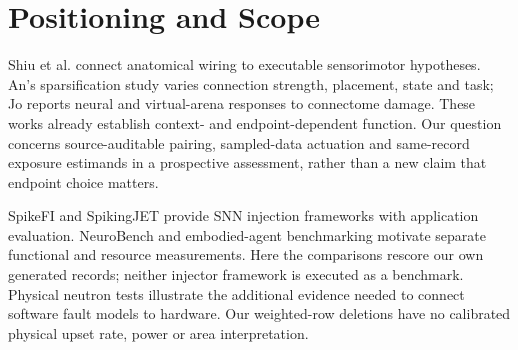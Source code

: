 \section{Positioning and Scope}
Shiu et al.\cite{shiu2024drosophila} connect anatomical wiring to executable sensorimotor hypotheses. An's sparsification study\cite{an2026sparse} varies connection strength, placement, state and task; Jo\cite{jo2026simulating} reports neural and virtual-arena responses to connectome damage. These works already establish context- and endpoint-dependent function. Our question concerns source-auditable pairing, sampled-data actuation and same-record exposure estimands in a prospective assessment, rather than a new claim that endpoint choice matters.

SpikeFI\cite{spyrou2024spikefi} and SpikingJET\cite{gogebakan2024spikingjet} provide SNN injection frameworks with application evaluation. NeuroBench\cite{yik2023neurobench} and embodied-agent benchmarking\cite{dangelo2026embodied} motivate separate functional and resource measurements. Here the comparisons rescore our own generated records; neither injector framework is executed as a benchmark. Physical neutron tests\cite{nijsink2026neutrons} illustrate the additional evidence needed to connect software fault models to hardware. Our weighted-row deletions have no calibrated physical upset rate, power or area interpretation.
